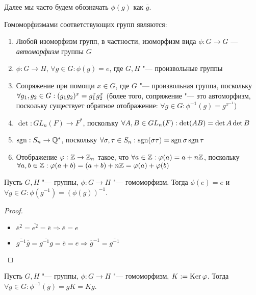 \begin{note}
	Далее мы часто будем обозначать $\phi(g)$ как $\overline{g}$.
\end{note}

\begin{example}
	Гомоморфизмами соответствующих групп являются:
	\begin{enumerate}
		\item Любой изоморфизм групп, в частности, изоморфизм вида $\phi: G \to G$ --- \textit{автоморфизм} группы $G$
		\item $\phi: G \to H$, $\forall g \in G: \phi(g) = e$, где $G, H$ "--- произвольные группы
		\item Сопряжение при помощи $x \in G$, где $G$ "--- произвольная группа, поскольку $\forall g_1, g_2 \hm\in G: (g_1g_2)^x = g_1^xg_2^x$ (более того, сопряжение "--- это автоморфизм, поскольку существует обратное отображение: $\forall g \in G: \phi^{-1}(g) = g^{x^{-1}}$)
		\item $\det: GL_n(F) \to F^*$, поскольку $\forall A, B \in GL_n(F): \det(AB) \hm= \det A \det B$
		\item $\operatorname{\mathop{sgn}}: S_n \to \mathbb{Q}^*$, поскольку $\forall \sigma, \tau \in S_n: \sgn(\sigma\tau) \hm= \sgn\sigma\sgn\tau$
		\item Отображение $\varphi: \mathbb{Z} \to \mathbb{Z}_n$ такое, что $\forall a \in \mathbb{Z}: \varphi(a) = a + n\mathbb{Z}$, поскольку $\forall a, b \in \Z: \phi(a + b) \hm= (a + b) + n\Z = \phi(a) + \phi(b)$
	\end{enumerate}
\end{example}

\begin{proposition}
	Пусть $G, H$ "--- группы, $\phi: G \to H$ "--- гомоморфизм. Тогда $\phi(e) = e$ и $\forall g \in G: \phi(g^{-1}) = (\phi(g))^{-1}$.
\end{proposition}

\begin{proof}~
	\begin{itemize}
		\item $\overline{e}^2 = \overline{e^2} = \overline{e} \Rightarrow \overline{e} = e$
		\item $\overline{g^{-1}}\overline{g} = \overline{g^{-1}g} = \overline{e} = e \Rightarrow \overline{g}^{-1} = \overline{g^{-1}}$
	\end{itemize}
\end{proof}

\begin{proposition}
	Пусть $G, H$ "--- группы, $\phi: G \to H$ "--- гомоморфизм, $K := \operatorname{Ker}\varphi$. Тогда $\forall g \in G: \phi^{-1}(\overline{g}) = gK = Kg$.
\end{proposition}


